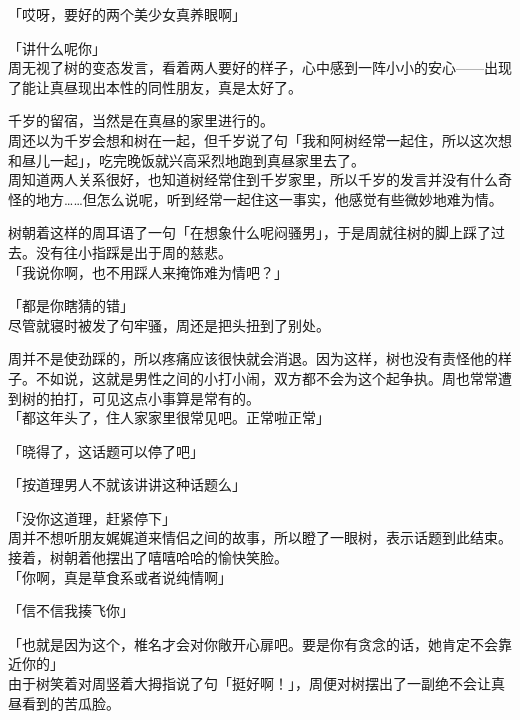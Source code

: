 「哎呀，要好的两个美少女真养眼啊」

「讲什么呢你」\\

周无视了树的变态发言，看着两人要好的样子，心中感到一阵小小的安心——出现了能让真昼现出本性的同性朋友，真是太好了。\\

\vspace{2\baselineskip}

千岁的留宿，当然是在真昼的家里进行的。\\

周还以为千岁会想和树在一起，但千岁说了句「我和阿树经常一起住，所以这次想和昼儿一起」，吃完晚饭就兴高采烈地跑到真昼家里去了。\\

周知道两人关系很好，也知道树经常住到千岁家里，所以千岁的发言并没有什么奇怪的地方……但怎么说呢，听到经常一起住这一事实，他感觉有些微妙地难为情。

树朝着这样的周耳语了一句「在想象什么呢闷骚男」，于是周就往树的脚上踩了过去。没有往小指踩是出于周的慈悲。\\

「我说你啊，也不用踩人来掩饰难为情吧？」

「都是你瞎猜的错」\\

尽管就寝时被发了句牢骚，周还是把头扭到了别处。

周并不是使劲踩的，所以疼痛应该很快就会消退。因为这样，树也没有责怪他的样子。不如说，这就是男性之间的小打小闹，双方都不会为这个起争执。周也常常遭到树的拍打，可见这点小事算是常有的。\\

「都这年头了，住人家家里很常见吧。正常啦正常」

「晓得了，这话题可以停了吧」

「按道理男人不就该讲讲这种话题么」

「没你这道理，赶紧停下」\\

周并不想听朋友娓娓道来情侣之间的故事，所以瞪了一眼树，表示话题到此结束。接着，树朝着他摆出了嘻嘻哈哈的愉快笑脸。\\

「你啊，真是草食系或者说纯情啊」

「信不信我揍飞你」

「也就是因为这个，椎名才会对你敞开心扉吧。要是你有贪念的话，她肯定不会靠近你的」\\

由于树笑着对周竖着大拇指说了句「挺好啊！」，周便对树摆出了一副绝不会让真昼看到的苦瓜脸。

